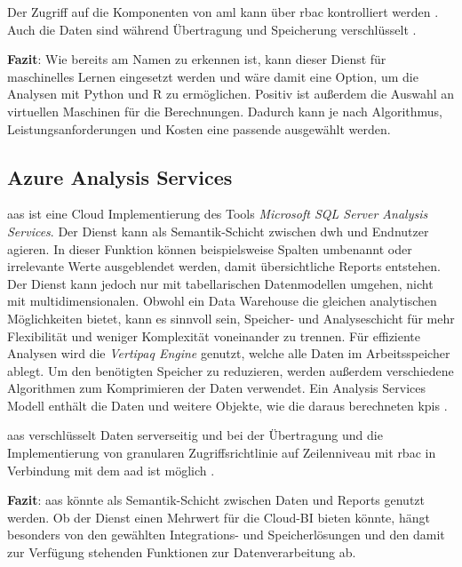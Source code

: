 Der Zugriff auf die Komponenten von \ac{aml} kann über \ac{rbac} kontrolliert werden \cite{msdoc_21_aml_roles}. Auch die Daten sind während Übertragung und Speicherung verschlüsselt \cite{msdoc_21_aml_dataEncryption}.

\textbf{Fazit}: Wie bereits am Namen zu erkennen ist, kann dieser Dienst für maschinelles Lernen eingesetzt werden und wäre damit eine Option, um die Analysen mit Python und R zu ermöglichen. Positiv ist außerdem die Auswahl an virtuellen Maschinen für die Berechnungen. Dadurch kann je nach Algorithmus, Leistungsanforderungen und Kosten eine passende ausgewählt werden.


\subsection{Azure Analysis Services} \label{sec:grundlagen:azure_dienste:analysisServices}
\ac{aas} ist eine Cloud Implementierung des Tools \textit{Microsoft SQL Server Analysis Services}. Der Dienst kann als Semantik-Schicht zwischen \ac{dwh} und Endnutzer agieren. In dieser Funktion können beispielsweise Spalten umbenannt oder irrelevante Werte ausgeblendet werden, damit übersichtliche Reports entstehen. Der Dienst kann jedoch nur mit tabellarischen Datenmodellen umgehen, nicht mit multidimensionalen. Obwohl ein Data Warehouse die gleichen analytischen Möglichkeiten bietet, kann es sinnvoll sein, Speicher- und Analyseschicht für mehr Flexibilität und weniger Komplexität voneinander zu trennen. Für effiziente Analysen wird die \textit{Vertipaq Engine} genutzt, welche alle Daten im Arbeitsspeicher ablegt. Um den benötigten Speicher zu reduzieren, werden außerdem verschiedene Algorithmen zum Komprimieren der Daten verwendet. Ein Analysis Services Modell enthält die Daten und weitere Objekte, wie die daraus berechneten \acp{kpi} \cite{how_beyond_2020}.

\ac{aas} verschlüsselt Daten serverseitig und bei der Übertragung und die Implementierung von granularen Zugriffsrichtlinie auf Zeilenniveau mit \ac{rbac} in Verbindung mit dem \ac{aad} ist möglich \cite{msdoc_21_aas}.

\textbf{Fazit}: \ac{aas} könnte als Semantik-Schicht zwischen Daten und Reports genutzt werden. Ob der Dienst einen Mehrwert für die Cloud-BI bieten könnte, hängt besonders von den gewählten Integrations- und Speicherlösungen und den damit zur Verfügung stehenden Funktionen zur Datenverarbeitung ab.


